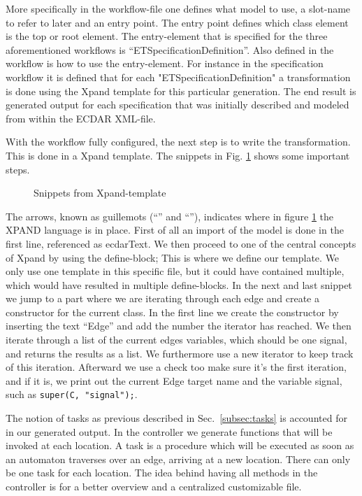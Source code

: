 More specifically in the workflow-file one defines what model to use, a
slot-name to refer to later and an entry point. The entry point defines which
class element is the top or root element. The entry-element that is specified for
the three aforementioned workflows is ``ETSpecificationDefinition''. Also defined
in the workflow is how to use the entry-element. For instance in the
specification workflow it is defined that for each "ETSpecificationDefinition" a
transformation is done using the Xpand template for this particular
generation. The end result is generated output for each specification that
was initially described and modeled from within the ECDAR XML-file.

With the workflow fully configured, the next step is to write the
transformation. This is done in a Xpand template. The snippets in Fig.
\ref{xpand-example} shows some important steps.

\begin{figure}[t]



\caption{Snippets from Xpand-template \label{xpand-example}}
\end{figure}

The arrows, known as guillemots (``\guillemotleft'' and ``\guillemotright''),
indicates where in figure \ref{xpand-example} the XPAND language is in place. First
of all an import of the model is done in the first line, referenced as
ecdarText. We then proceed to one of the central concepts of Xpand by using the
define-block; This is where we define our template. We only use one template in
this specific file, but it could have contained multiple, which would have
resulted in multiple define-blocks. In the next and last snippet we jump to a
part where we are iterating through each edge and create a constructor for the
current class. In the first line we create the constructor by inserting the text
``Edge'' and add the number the iterator has reached. We then iterate through a
list of the current edges variables, which should be one signal, and returns the
results as a list. We furthermore use a new iterator to keep track of this
iteration. Afterward we use a check too make sure it's the first iteration, and if it is, we
print out the current Edge target name and the variable signal, such as \texttt{super(C,
"signal");}.

The notion of tasks as previous described in Sec.~\ref{subsec:tasks} is accounted for in
our generated output. In the controller we generate functions that will be
invoked at each location. A task is a procedure which will be executed as soon
as an automaton traverses over an edge, arriving at a new location. There can
only be one task for each location. The idea behind having all methods in the
controller is for a better overview and a centralized customizable file.
